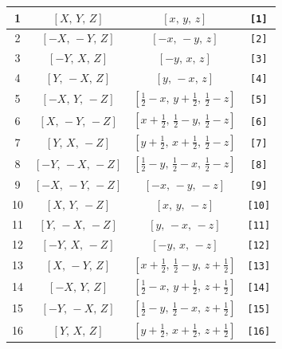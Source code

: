 \documentclass[fleqn,8pt]{jsarticle}
\begin{document}
\begin{longtable}{cccc}
1 & $\left[ X,\, Y,\, Z \right]$ & $\left[ x,\, y,\, z \right]$ & {\tt [1]} \\ \hline
2 & $\left[ - X,\, - Y,\, Z \right]$ & $\left[ - x,\, - y,\, z \right]$ & {\tt [2]} \\ \hline
3 & $\left[ - Y,\, X,\, Z \right]$ & $\left[ - y,\, x,\, z \right]$ & {\tt [3]} \\ \hline
4 & $\left[ Y,\, - X,\, Z \right]$ & $\left[ y,\, - x,\, z \right]$ & {\tt [4]} \\ \hline
5 & $\left[ - X,\, Y,\, - Z \right]$ & $\left[ \frac{1}{2} - x,\, y + \frac{1}{2},\, \frac{1}{2} - z \right]$ & {\tt [5]} \\ \hline
6 & $\left[ X,\, - Y,\, - Z \right]$ & $\left[ x + \frac{1}{2},\, \frac{1}{2} - y,\, \frac{1}{2} - z \right]$ & {\tt [6]} \\ \hline
7 & $\left[ Y,\, X,\, - Z \right]$ & $\left[ y + \frac{1}{2},\, x + \frac{1}{2},\, \frac{1}{2} - z \right]$ & {\tt [7]} \\ \hline
8 & $\left[ - Y,\, - X,\, - Z \right]$ & $\left[ \frac{1}{2} - y,\, \frac{1}{2} - x,\, \frac{1}{2} - z \right]$ & {\tt [8]} \\ \hline
9 & $\left[ - X,\, - Y,\, - Z \right]$ & $\left[ - x,\, - y,\, - z \right]$ & {\tt [9]} \\ \hline
10 & $\left[ X,\, Y,\, - Z \right]$ & $\left[ x,\, y,\, - z \right]$ & {\tt [10]} \\ \hline
11 & $\left[ Y,\, - X,\, - Z \right]$ & $\left[ y,\, - x,\, - z \right]$ & {\tt [11]} \\ \hline
12 & $\left[ - Y,\, X,\, - Z \right]$ & $\left[ - y,\, x,\, - z \right]$ & {\tt [12]} \\ \hline
13 & $\left[ X,\, - Y,\, Z \right]$ & $\left[ x + \frac{1}{2},\, \frac{1}{2} - y,\, z + \frac{1}{2} \right]$ & {\tt [13]} \\ \hline
14 & $\left[ - X,\, Y,\, Z \right]$ & $\left[ \frac{1}{2} - x,\, y + \frac{1}{2},\, z + \frac{1}{2} \right]$ & {\tt [14]} \\ \hline
15 & $\left[ - Y,\, - X,\, Z \right]$ & $\left[ \frac{1}{2} - y,\, \frac{1}{2} - x,\, z + \frac{1}{2} \right]$ & {\tt [15]} \\ \hline
16 & $\left[ Y,\, X,\, Z \right]$ & $\left[ y + \frac{1}{2},\, x + \frac{1}{2},\, z + \frac{1}{2} \right]$ & {\tt [16]} \\
\end{longtable}
\end{document}
